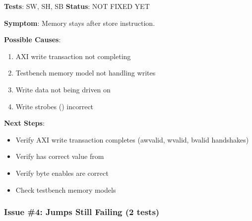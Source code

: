 \begin{record}

\textbf{Tests}: SW, SH, SB \textbf{Status}: \bad{} NOT FIXED YET

\textbf{Symptom}: Memory stays  after store
instruction.

\textbf{Possible Causes}:

\begin{enumerate}
\def\labelenumi{\arabic{enumi}.}
\tightlist
\item
  AXI write transaction not completing
\item
  Testbench memory model not handling writes
\item
  Write data not being driven on 
\item
  Write strobes () incorrect
\end{enumerate}

\textbf{Next Steps}:

\begin{itemize}
\tightlist
\item
  Verify AXI write transaction completes (awvalid, wvalid, bvalid
  handshakes)
\item
  Verify  has correct value from 
\item
  Verify  byte enables are correct
\item
  Check testbench memory model\textquotesingle s
\end{itemize}

\end{record}

\subsubsection{Issue \#4: Jumps Still Failing (2 tests)}\label{cr:fix:rtl-bug-fixes:issue-4-jumps-still-failing-2-tests}

